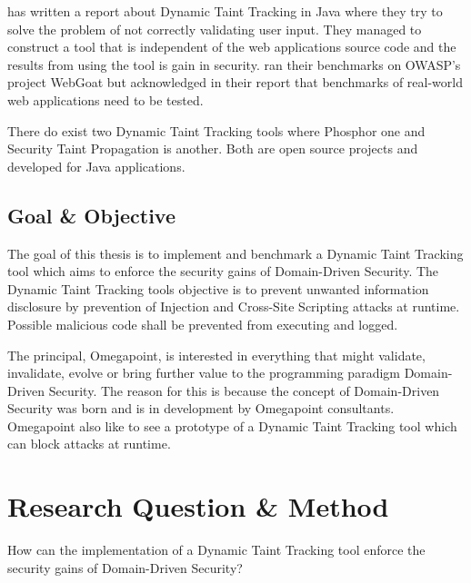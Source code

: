 \documentclass{../kththesis}
\begin{document}
	\textcite{Haldar} has written a report about Dynamic Taint Tracking in Java where they try to solve the problem of not correctly validating user input. They managed to construct a tool that is independent of the web applications source code and the results from using the tool is gain in security. \textcite{Haldar} ran their benchmarks on OWASP’s project WebGoat \parencite{webgoat} but acknowledged in their report that benchmarks of real-world web applications need to be tested.
	
	There do exist two Dynamic Taint Tracking tools where Phosphor \parencite{phosphor} one and Security Taint Propagation \parencite{securityTaint} is another. Both are open source projects and developed for Java applications.
	
	
	\section{Goal \& Objective}
	The goal of this thesis is to implement and benchmark a Dynamic Taint Tracking tool which aims to enforce the security gains of Domain-Driven Security. The Dynamic Taint Tracking tools objective is to prevent unwanted information disclosure by prevention of Injection and Cross-Site Scripting attacks at runtime. Possible malicious code shall be prevented from executing and logged.
	
	The principal, Omegapoint, is interested in everything that might validate, invalidate, evolve or bring further value to the programming paradigm Domain-Driven Security. The reason for this is because the concept of Domain-Driven Security was born and is in development by Omegapoint consultants. Omegapoint also like to see a prototype of a Dynamic Taint Tracking tool which can block attacks at runtime.
	
	
	
	\chapter{Research Question \& Method} \label{ResearchQuestionMethod}
	\begin{chapquote}{}
			How can the implementation of a Dynamic Taint Tracking tool enforce the security gains of Domain-Driven Security?
	\end{chapquote}
	
\end{document}
